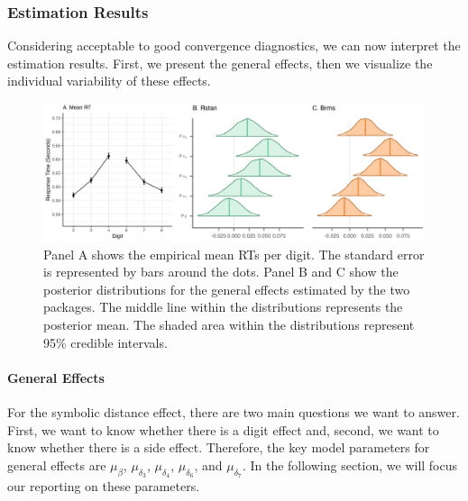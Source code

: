 \documentclass[
  english,
  doc,floatsintext]{apa6}
\let\oldparagraph\paragraph
\renewcommand{\paragraph}[1]{\oldparagraph{#1}\mbox{}}
\begin{document}
\hypertarget{estimation-results}{%
\subsubsection{Estimation Results}\label{estimation-results}}

Considering acceptable to good convergence diagnostics, we can now interpret the estimation results. First, we present the general effects, then we visualize the individual variability of these effects.

\begin{figure}[H]

\includegraphics[width=1\linewidth]{I - Images/Fig9_posteriormu_v3} \hfill{}

\caption{Panel A shows the empirical mean RTs per digit. The standard error is represented by bars around the dots. Panel B and C show the posterior distributions for the general effects estimated by the two packages. The middle line within the distributions represents the posterior mean. The shaded area within the distributions represent 95\% credible intervals.}\label{fig:modelposteriorsmufigure3}
\end{figure}

\hypertarget{general-effects}{%
\paragraph{General Effects}\label{general-effects}}

For the symbolic distance effect, there are two main questions we want to answer. First, we want to know whether there is a digit effect and, second, we want to know whether there is a side effect. Therefore, the key model parameters for general effects are \(\mu_{\beta}\), \(\mu_{\delta_{3}}\), \(\mu_{\delta_4}\), \(\mu_{\delta_6}\), and \(\mu_{\delta_{7}}\). In the following section, we will focus our reporting on these parameters.
\end{document}
